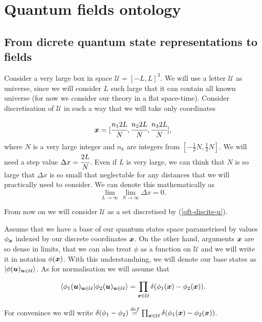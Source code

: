 \documentclass[main.tex]{subfiles}
\begin{document}
\section{Quantum fields ontology}

\subsection{From dicrete quantum state representations to fields}

Consider a very large box in space $\mathcal{U} = [-L, L]^3$. 
We will use a letter $\mathcal{U}$ as universe, since we will consider $L$ such large that it can contain all known universe (for now we consider our theory in a flat space-time). Consider discretisation of $\mathcal{U}$ in such a way that we will take only coordinates

\begin{equation}
\label{qft-discite-u}
\boldsymbol{x} = [\cfrac{n_1 2L}{N}, \cfrac{n_2 2L}{N}, \cfrac{n_3 2L}{N}], 
\end{equation}
where $N$ is a very large integer and $n_k$ are integers from $[-\frac{1}{2} N, \frac{1}{2}N]$. We will need a step value $\Delta  x = \cfrac{2L}{N}$. Even if $L$ is very large, we can think that $N$ is so large that $\Delta x$ is so small that neglectable for any distances that we will practically need to consider. We can denote this mathematically as
\begin{equation}
\lim_{L\to \infty}\lim_{N\to\infty} \Delta x = 0.
\end{equation}

From now on we will consider $\mathcal{U}$ as a set discretised by (\ref{qft-discite-u}).

Assume that we have a base of our quantum states space parametrised by values $\phi_{\boldsymbol{x}}$ indexed by our discrete coordinates $\boldsymbol{x}$. On the other hand, arguments $\boldsymbol{x}$ are so dense in limits, that we can also treat $\phi$ as a function on $\mathcal{U}$ and we will write it in notation $\phi(\boldsymbol{x})$. With this understandning, we will denote our base states as $\ket{\phi(\boldsymbol{u})_{\boldsymbol{u}\in \mathcal{U}}}$. As for normalisation we will assume that 

\begin{equation}
\bra{\phi_1(\boldsymbol{u})_{\boldsymbol{u}\in \mathcal{U}}} \ket{\phi_2(\boldsymbol{u})_{\boldsymbol{u}\in \mathcal{U}}} 
= \prod_{\boldsymbol{x}\in \mathcal{U}} \delta(\phi_1(\boldsymbol{x}) - \phi_2(\boldsymbol{x})).
\end{equation}

For convenince we will write $\delta(\phi_1 - \phi_2) \stackrel{def}{=} \prod_{\boldsymbol{x}\in \mathcal{U}} \delta(\phi_1(\boldsymbol{x}) - \phi_2(\boldsymbol{x}))$.
\end{document}
